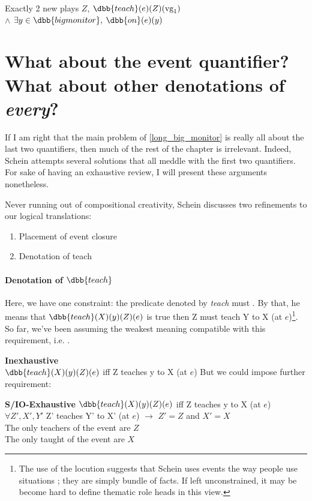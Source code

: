 \begin{nothing}
\ex
\textsf{Exactly 2 new plays} $Z$, $\dbb{teach}(e)(Z)(\text{vg}_{1})$\\
$\wedge$ $\exists y\in\dbb{big monitor},$ $\dbb{on}(e)(y)$
\xe
%
\end{nothing}

\section{What about the event quantifier? What about other denotations of \emph{every}?}
If I am right that the main problem of \cref{long_big_monitor} is really all about the last two quantifiers, then much of the rest of the chapter is irrelevant. Indeed, Schein attempts several solutions that all meddle with the first two quantifiers. For sake of having an exhaustive review, I will present these arguments nonetheless.


Never running out of compositional creativity, Schein discusses two refinements to our logical translations:

\begin{enumerate}
\item 
Placement of event closure

\item 
Denotation of teach
\end{enumerate}

\paragraph{Denotation of $\dbb{teach}$} Here, we have one constraint: the predicate denoted by \emph{teach} must . By that, he means that $\dbb{teach}(X)(y)(Z)(e)$ is true then Z must teach Y to X (at $e$)\footnote{The use of the locution  suggests that Schein uses events the way people use situations ; they are simply bundle of facts. If left unconstrained, it may be become hard to define thematic role heads in this view.}. So far, we've been assuming the weakest meaning  compatible with this requirement, i.e. \cnextx. 


\ex
 \textbf{Inexhaustive}\\
$\dbb{teach}(X)(y)(Z)(e)$ iff Z teaches y to X (at $e$)
\xe
%
But we could impose further requirement:

\pex \textbf{S/IO-Exhaustive}
\a 
$\dbb{teach}(X)(y)(Z)(e)$ iff Z teaches y to X (at $e$)\\
$\forall Z', X', Y'$ Z' teaches Y' to X' (at $e$) $\rightarrow$ $Z'=Z$ and $X'=X$\\
\a 
The only teachers of the event are $Z$\\
The only taught of the event are $X$
\xe
%

